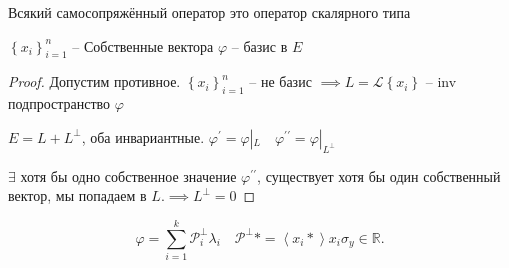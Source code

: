 \documentclass{book}
\newcommand\R{\ensuremath{\mathbb{R}}}
\newcommand{\p}[1]{#1^{\prime}}
\newcommand{\pp}[1]{#1^{\prime\prime}}
\theoremstyle{definition}
\begin{document}
\begin{theorem}
    Всякий самосопряжённый оператор это оператор скалярного типа

    $\left\{ x_i \right\} _{i=1}^n$ -- Собственные вектора $\varphi$ -- базис в  $E$
\end{theorem}
\begin{proof}
    Допустим противное. $\left\{ x_i \right\} _{i=1}^n$ -- не базис $\implies  L = \mathcal L\left\{ x_i \right\} $ -- inv подпространство $\varphi$

    $E = L + L^{\perp}$, оба инвариантные.  $\p \varphi = \varphi |_L\quad \pp \varphi = \varphi |_{L^{\perp }}$ 

    $\exists $ хотя бы одно собственное значение $\pp \varphi$, существует хотя бы один собственный вектор, мы попадаем в $L$.$ \implies L^{\perp } = {0}$
\end{proof}

\begin{theorem}
    \[
        \varphi = \sum_{i=1}^{k} \mathcal P_i^{\perp }\lambda_i\quad \mathcal P^{\perp } * =\left<x_i * \right> x_i
        \sigma_y\in \R
    .\] 
\end{theorem}
\end{document}
